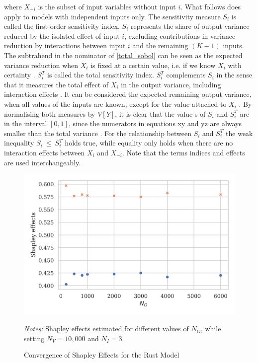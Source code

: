 \noindent where $X_{- i}$ is the subset of input variables without input $i$. What follows does apply to models with independent inputs only. The sensitivity measure $S_i$ is called the first-order sensitivity index. $S_i$ represents the share of output variance reduced by the isolated effect of input $i$, excluding contributions in variance reduction by interactions between input $i$ and the remaining $(K-1)$ inputs. The subtrahend in the nominator of \cref{total_sobol} can be seen as the expected variance reduction when $X_i$ is fixed at a certain value, i.e. if we know $X_i$ with certainty \citep{SNS16}. $S_i^T$ is called the total sensitivity index. $S_i^T$ complements $S_i$ in the sense that it measures the total effect of $X_i$ in the output variance, including interaction effects \citep{SNS16}. It can be considered the expected remaining output variance, when all values of the inputs are known, except for the value attached to $X_i$ \citep{SNS16}. By normalising both measures by $V[Y]$, it is clear that the value s of $S_i$ and $S_i^T$ are in the interval $[0, 1]$, since the numerators in equations xy and yz are always smaller than the total variance \citep{GM17}. For the relationship between $S_i$ and $S_i^T$ the weak inequality $S_i\ \le\ S_i^T$ holds true, while equality only holds when there are no interaction effects between $X_i$ and $X_{- i}$. Note that the terms indices and effects are used interchangeably.

\begin{figure}[t]
	\caption{Convergence of Shapley Effects for the Rust Model}
    \label{shapley_convergence}
	\vspace*{-4mm}
	\begin{centering}
	\includegraphics[scale=0.9]{../figures/convergence_shapley_effects_8.png}
	\end{centering}

	\small
	\textit{Notes:} Shapley effects estimated for different values of $N_O$, while setting $N_V=10,000$ and $N_I=3$.
\end{figure}

